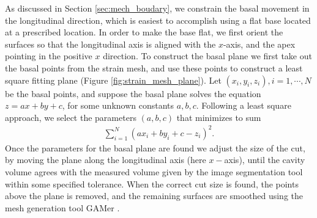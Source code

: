 As discussed in Section \ref{sec:mech_boudary}, we constrain the basal movement in
the longitudinal direction, which is easiest to accomplish using a flat
base located at a prescribed location. In order to make the base flat,
we first orient the surfaces so that the longitudinal axis is aligned
with the $x$-axis, and the apex pointing in the positive $x$
direction. To construct the basal plane we first take out the basal
points from the strain mesh, and use these points to construct a least
square fitting plane (Figure \ref{fig:strain_mesh_plane}). Let $(x_i, y_i, z_i), i = 1, \cdots, N$
be the basal points, and suppose the basal plane solves the equation
$z = ax + by + c$, for some unknown constants $a,b,c$. Following a
least square approach, we select the parameters $(a,b,c)$ that
minimizes to sum
\begin{align}
  \sum_{i = 1}^{N} \left(ax_i + by_i + c  - z_i \right)^2.
\end{align}
Once the parameters for the basal plane are found we adjust the size of
the cut, by moving the plane along the longitudinal axis (here
$x-$axis), until the cavity volume agrees with the measured volume
given by the image segmentation tool within some specified tolerance. 
When the correct cut size is found, the points above the plane is removed,
and the remaining surfaces are smoothed using the mesh generation tool GAMer
\cite{yu2008feature}.

